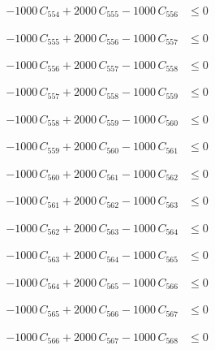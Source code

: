 \documentclass[a4paper,11pt]{article}
\begin{document}
\begin{align}
-1000\,C_{554} + 2000\,C_{555} - 1000\,C_{556} &\leq 0 \nonumber
\end{align}

\begin{align}
-1000\,C_{555} + 2000\,C_{556} - 1000\,C_{557} &\leq 0 \nonumber
\end{align}

\begin{align}
-1000\,C_{556} + 2000\,C_{557} - 1000\,C_{558} &\leq 0 \nonumber
\end{align}

\begin{align}
-1000\,C_{557} + 2000\,C_{558} - 1000\,C_{559} &\leq 0 \nonumber
\end{align}

\begin{align}
-1000\,C_{558} + 2000\,C_{559} - 1000\,C_{560} &\leq 0 \nonumber
\end{align}

\begin{align}
-1000\,C_{559} + 2000\,C_{560} - 1000\,C_{561} &\leq 0 \nonumber
\end{align}

\begin{align}
-1000\,C_{560} + 2000\,C_{561} - 1000\,C_{562} &\leq 0 \nonumber
\end{align}

\begin{align}
-1000\,C_{561} + 2000\,C_{562} - 1000\,C_{563} &\leq 0 \nonumber
\end{align}

\begin{align}
-1000\,C_{562} + 2000\,C_{563} - 1000\,C_{564} &\leq 0 \nonumber
\end{align}

\begin{align}
-1000\,C_{563} + 2000\,C_{564} - 1000\,C_{565} &\leq 0 \nonumber
\end{align}

\begin{align}
-1000\,C_{564} + 2000\,C_{565} - 1000\,C_{566} &\leq 0 \nonumber
\end{align}

\begin{align}
-1000\,C_{565} + 2000\,C_{566} - 1000\,C_{567} &\leq 0 \nonumber
\end{align}

\begin{align}
-1000\,C_{566} + 2000\,C_{567} - 1000\,C_{568} &\leq 0 \nonumber
\end{align}
\end{document}

